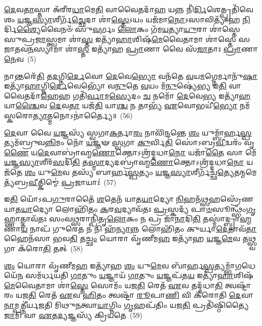 \-\ul{𑌦𑍇}\-𑌵\-\ul{𑌤𑌾}\-𑌸𑍍𑌤𑌾 𑌅᳴𑌰𑍀𑌰\-\ul{𑌧𑌾}\-𑌮𑍇\-\ul{𑌤𑌿} 𑌵𑌾𑌵𑍈𑌤𑌦𑌾᳴\-\ul{𑌹} 𑌯𑌨𑍍𑌨 𑌨𑌿᳴\-\ul{𑌰𑍍𑌦𑌿}\-𑌶𑍇𑌤𑍍𑌪𑍍𑌰𑌤𑌿᳴𑌵𑍇𑌶𑌂 \ul{𑌯}\-𑌜𑍍𑌞\-\ul{𑌸𑍍𑌯𑌾}\-𑌶𑍀𑌰𑍍𑌗᳴\-\ul{𑌚𑍍𑌛𑍇}\-𑌦𑌾 𑌶𑌾॑\-\ul{𑌸𑍍𑌤𑍇}\-\-𑌽𑌯𑌂 𑌯𑌜᳴𑌮𑌾\-\ul{𑌨𑍋}\-\-𑌽𑌸𑌾𑌵𑌿𑌤𑍍𑌯𑌾᳴𑌹 \ul{𑌨𑌿}\-𑌰𑍍𑌦𑌿\-\ul{𑌶𑍍𑌯𑍈}\-𑌵𑍈𑌨𑍞᳴ 𑌸𑍁\-\ul{𑌵}\-𑌰𑍍𑌗𑌂 \ul{𑌲𑍋}\-𑌕𑌂 𑌗᳴𑌮\-\ul{𑌯}\-𑌤𑍍𑌯𑌾\-\ul{𑌯𑍁}\-𑌰𑌾 𑌶𑌾॑𑌸𑍍𑌤𑍇 𑌸𑍁𑌪𑍍𑌰\-\ul{𑌜𑌾}\-𑌸𑍍𑌤𑍍𑌵𑌮𑌾 𑌶𑌾॑\-\ul{𑌸𑍍𑌤} 𑌇𑌤𑍍𑌯𑌾᳴\-\ul{𑌹𑌾}\-𑌶𑌿𑌷᳴\-\ul{𑌮𑍇}\-𑌵𑍈𑌤𑌾𑌮𑌾 𑌶𑌾॑𑌸𑍍𑌤𑍇 𑌸𑌜𑌾𑌤𑌵\-\ul{𑌨}\-𑌸𑍍𑌯𑌾𑌮𑌾 𑌶𑌾॑\-\ul{𑌸𑍍𑌤} 𑌇𑌤𑍍𑌯𑌾᳴𑌹 \ul{𑌪𑍍𑌰𑌾}\-𑌣𑌾 𑌵𑍈 𑌸᳴\-\ul{𑌜𑌾}\-𑌤𑌾𑌃 \ul{𑌪𑍍𑌰𑌾}\-𑌣𑌾\-\ul{𑌨𑍇}\-𑌵~(5)

𑌨𑌾𑌨𑍍𑌤𑌰𑍇᳴\-\ul{𑌤𑌿} 𑌤\-\ul{𑌦}\-𑌗𑍍𑌨𑌿\-\ul{𑌰𑍍𑌦𑍇}\-𑌵𑍋 \ul{𑌦𑍇}\-𑌵𑍇\-\ul{𑌭𑍍𑌯𑍋} 𑌵𑌨᳴𑌤𑍇 \ul{𑌵}\-𑌯\-\ul{𑌮}\-𑌗𑍍𑌨𑍇𑌰𑍍𑌮𑌾𑌨𑍁᳴\-\ul{𑌷𑌾} 𑌇𑌤𑍍𑌯𑌾᳴\-\ul{𑌹𑌾}\-𑌗𑍍𑌨𑌿\-\ul{𑌰𑍍𑌦𑍇}\-𑌵𑍇𑌭𑍍𑌯𑍋᳴ 𑌵\-\ul{𑌨𑍁}\-𑌤𑍇 \ul{𑌵}\-𑌯𑌂 𑌮᳴\-\ul{𑌨𑍁}\-𑌷𑍍𑌯𑍇॑\-\ul{𑌭𑍍𑌯} 𑌇\-\ul{𑌤𑌿} 𑌵𑌾𑌵𑍈𑌤𑌦𑌾᳴\-\ul{𑌹𑍇}\-𑌹 𑌗𑌤𑌿᳴\-\ul{𑌰𑍍𑌵𑌾}\-𑌮\-\ul{𑌸𑍍𑌯𑍇}\-𑌦𑌂 \ul{𑌚} 𑌨𑌮𑍋᳴ \ul{𑌦𑍇}\-𑌵𑍇\-\ul{𑌭𑍍𑌯} 𑌇𑌤𑍍𑌯𑌾᳴\-\ul{𑌹} 𑌯𑌾\-\ul{𑌶𑍍𑌚𑍈}\-𑌵 \ul{𑌦𑍇}\-𑌵\-\ul{𑌤𑌾} 𑌯𑌜᳴\-\ul{𑌤𑌿} 𑌯𑌾\-\ul{𑌶𑍍𑌚} 𑌨 𑌤𑌾𑌭𑍍𑌯᳴ \ul{𑌏}\-𑌵𑍋𑌭𑌯𑍀॑\-\ul{𑌭𑍍𑌯𑍋} 𑌨𑌮᳴𑌸𑍍𑌕𑌰𑍋\-\ul{𑌤𑍍𑌯𑌾}\-𑌤𑍍𑌮𑌨𑍋\-𑌽𑌨𑌾॑𑌰𑍍𑌤𑍍𑌯𑍈॥~(56)

{\anuvakamend[{\-\ul{𑌶𑍍𑌰𑌿}\-𑌤\-\ul{𑌸𑍍𑌤𑍇} 𑌪𑍍𑌰 \ul{𑌤𑍍𑌰𑌿}\-𑌷𑍍𑌟𑍁𑌭᳴\-\ul{𑌮𑍇}\-𑌤𑌦𑍍𑌦𑍍𑌯𑌾𑌵𑌾᳴𑌪𑍃\-\ul{𑌥𑌿}\-𑌵𑍀 𑌯𑌾 𑌅𑌯𑌾॑𑌕𑍍𑌷𑍍𑌮 \ul{𑌪𑍍𑌰𑌾}\-𑌣𑌾\-\ul{𑌨𑍇}\-𑌵 𑌷𑌟𑍍𑌚᳴𑌤𑍍𑌵𑌾𑌰𑌿𑍞𑌶𑌚𑍍𑌚}]}%

\-\ul{𑌦𑍇}\-𑌵𑌾 𑌵𑍈 \ul{𑌯}\-𑌜𑍍𑌞𑌸𑍍𑌯᳴ 𑌸𑍍𑌵𑌗𑌾\-\ul{𑌕}\-𑌰𑍍𑌤𑌾\-\ul{𑌰𑌂} 𑌨𑌾𑌵𑌿᳴\-\ul{𑌨𑍍𑌦}\-𑌨𑍍𑌤𑍇 \ul{𑌶𑌂} 𑌯𑍁𑌮𑍍𑌬𑌾᳴𑌰𑍍\mbox{}𑌹\-\ul{𑌸𑍍𑌪}\-𑌤𑍍𑌯𑌮᳴𑌬𑍍𑌰𑍁𑌵\-\ul{𑌨𑍍𑌨𑌿}\-𑌮𑌂 𑌨𑍋᳴ \ul{𑌯}\-𑌜𑍍𑌞𑍟 \ul{𑌸𑍍𑌵}\-𑌗𑌾 \ul{𑌕𑍁}\-𑌰𑍍𑌵𑌿\-\ul{𑌤𑌿} 𑌸𑍋॑\-𑌽𑌬𑍍𑌰\-\ul{𑌵𑍀}\-𑌦𑍍𑌵𑌰𑌂᳴ 𑌵𑍃\-\ul{𑌣𑍈} 𑌯\-\ul{𑌦𑍇}\-𑌵𑌾𑌬𑍍𑌰𑌾॑𑌹𑍍𑌮\-\ul{𑌣𑍋}\-𑌕𑍍𑌤𑍋\-𑌽𑌶𑍍𑌰᳴𑌦𑍍𑌦𑌧𑌾\-\ul{𑌨𑍋} 𑌯𑌜𑌾᳴\-\ul{𑌤𑍈} 𑌸𑌾 𑌮𑍇᳴ \ul{𑌯}\-𑌜𑍍𑌞\-\ul{𑌸𑍍𑌯𑌾}\-𑌶𑍀𑌰᳴\-\ul{𑌸}\-𑌦𑌿\-\ul{𑌤𑌿} 𑌤\-\ul{𑌸𑍍𑌮𑌾}\-𑌦𑍍𑌯𑌦𑌬𑍍𑌰𑌾॑𑌹𑍍𑌮\-\ul{𑌣𑍋}\-𑌕𑍍𑌤𑍋\-𑌽𑌶𑍍𑌰᳴𑌦𑍍𑌦𑌧𑌾\-\ul{𑌨𑍋} 𑌯𑌜᳴𑌤𑍇 \ul{𑌶𑌂} 𑌯𑍁\-\ul{𑌮𑍇}\-𑌵 𑌤𑌸𑍍𑌯᳴ 𑌬𑌾𑌰𑍍\mbox{}𑌹\-\ul{𑌸𑍍𑌪}\-𑌤𑍍𑌯𑌂 \ul{𑌯}\-𑌜𑍍𑌞\-\ul{𑌸𑍍𑌯𑌾}\-𑌶𑍀𑌰𑍍𑌗᳴𑌚𑍍𑌛\-\ul{𑌤𑍍𑌯𑍇}\-𑌤𑌨𑍍𑌮𑌮𑍇𑌤𑍍𑌯᳴𑌬𑍍𑌰\-\ul{𑌵𑍀}\-𑌤𑍍𑌕𑌿𑌮𑍍𑌮𑍇॑ \ul{𑌪𑍍𑌰}\-𑌜𑌾𑌯𑌾𑌃॑~(57)

𑌇\-\ul{𑌤𑌿} 𑌯𑍋᳴\-𑌽𑌪\-\ul{𑌗𑍁}\-𑌰𑌾𑌤𑍈᳴ \ul{𑌶}\-𑌤𑍇𑌨᳴ 𑌯𑌾𑌤\-\ul{𑌯𑌾}\-𑌦𑍍𑌯𑍋 \ul{𑌨𑌿}\-𑌹𑌨᳴\-\ul{𑌥𑍍𑌸}\-𑌹𑌸𑍍𑌰𑍇᳴𑌣 𑌯𑌾𑌤\-\ul{𑌯𑌾}\-𑌦𑍍𑌯𑍋 𑌲𑍋𑌹𑌿᳴𑌤𑌂 \ul{𑌕}\-𑌰\-\ul{𑌵}\-𑌦𑍍𑌯𑌾𑌵᳴𑌤𑌃 \ul{𑌪𑍍𑌰}\-𑌸𑍍𑌕𑌦𑍍𑌯᳴ 𑌪𑌾\-\ul{𑍞}\-𑌸𑍂𑌨𑍍𑌥𑍍𑌸𑌂᳴\-\ul{𑌗𑍃}\-𑌹𑍍𑌣𑌾𑌤𑍍𑌤𑌾𑌵᳴𑌤𑌃 𑌸𑌂𑌵\-\ul{𑌥𑍍𑌸}\-𑌰𑌾𑌨𑍍𑌪𑌿᳴𑌤𑍃\-\ul{𑌲𑍋}\-𑌕𑌂 𑌨 𑌪𑍍𑌰 𑌜𑌾᳴\-\ul{𑌨𑌾}\-𑌦𑌿\-\ul{𑌤𑌿} 𑌤𑌸𑍍𑌮𑌾॑𑌦𑍍𑌬𑍍𑌰𑌾\-\ul{𑌹𑍍𑌮}\-𑌣𑌾\-\ul{𑌯} 𑌨𑌾𑌪᳴ 𑌗𑍁𑌰𑍇\-\ul{𑌤} 𑌨 𑌨𑌿 𑌹᳴\-\ul{𑌨𑍍𑌯𑌾}\-𑌨𑍍𑌨 𑌲𑍋𑌹𑌿᳴𑌤𑌂 𑌕𑍁𑌰𑍍𑌯𑌾\-\ul{𑌦𑍇}\-𑌤𑌾𑌵᳴\-\ul{𑌤𑌾} 𑌹𑍈𑌨᳴𑌸𑌾 𑌭𑌵\-\ul{𑌤𑌿} 𑌤\-\ul{𑌚𑍍𑌛𑌂} 𑌯𑍋𑌰𑌾 𑌵𑍃᳴𑌣𑍀𑌮\-\ul{𑌹} 𑌇𑌤𑍍𑌯𑌾᳴𑌹 \ul{𑌯}\-𑌜𑍍𑌞\-\ul{𑌮𑍇}\-𑌵 𑌤\-\ul{𑌥𑍍𑌸𑍍𑌵}\-𑌗𑌾 𑌕᳴𑌰𑍋\-\ul{𑌤𑌿} 𑌤𑌤𑍍~(58)

\-\ul{𑌶𑌂} 𑌯𑍋𑌰𑌾 𑌵𑍃᳴𑌣𑍀𑌮\-\ul{𑌹} 𑌇𑌤𑍍𑌯𑌾᳴𑌹 \ul{𑌶𑌂} 𑌯𑍁\-\ul{𑌮𑍇}\-𑌵 𑌬𑌾᳴𑌰𑍍\mbox{}𑌹\-\ul{𑌸𑍍𑌪}\-𑌤𑍍𑌯𑌮𑍍𑌭𑌾᳴\-\ul{𑌗}\-𑌧𑍇𑌯𑍇᳴\-\ul{𑌨} 𑌸𑌮᳴𑌰𑍍𑌧𑌯𑌤𑌿 \ul{𑌗𑌾}\-𑌤𑍁𑌂 \ul{𑌯}\-𑌜𑍍𑌞𑌾𑌯᳴ \ul{𑌗𑌾}\-𑌤𑍁𑌂 \ul{𑌯}\-𑌜𑍍𑌞𑌪᳴𑌤\-\ul{𑌯} 𑌇𑌤𑍍𑌯𑌾᳴\-\ul{𑌹𑌾}\-𑌶𑌿𑌷᳴\-\ul{𑌮𑍇}\-𑌵𑍈𑌤𑌾𑌮𑌾 𑌶𑌾॑\-\ul{𑌸𑍍𑌤𑍇} 𑌸𑍋𑌮𑌂᳴ 𑌯𑌜\-\ul{𑌤𑌿} 𑌰𑍇𑌤᳴ \ul{𑌏}\-𑌵 𑌤𑌦𑍍𑌦᳴𑌧𑌾\-\ul{𑌤𑌿} 𑌤𑍍𑌵𑌷𑍍𑌟𑌾᳴𑌰𑌂 𑌯𑌜\-\ul{𑌤𑌿} 𑌰𑍇𑌤᳴ \ul{𑌏}\-𑌵 \ul{𑌹𑌿}\-𑌤𑌂 𑌤𑍍𑌵𑌷𑍍𑌟𑌾᳴ \ul{𑌰𑍂}\-𑌪𑌾\-\ul{𑌣𑌿} 𑌵𑌿 𑌕᳴𑌰𑍋𑌤𑌿 \ul{𑌦𑍇}\-𑌵𑌾\-\ul{𑌨𑌾}\-𑌮𑍍𑌪𑌤𑍍𑌨𑍀॑𑌰𑍍𑌯𑌜𑌤𑌿 𑌮𑌿𑌥𑍁\-\ul{𑌨}\-𑌤𑍍𑌵𑌾\-\ul{𑌯𑌾}\-𑌗𑍍𑌨𑌿𑌂 \ul{𑌗𑍃}\-𑌹𑌪᳴𑌤𑌿𑌂 𑌯𑌜\-\ul{𑌤𑌿} 𑌪𑍍𑌰𑌤𑌿᳴𑌷𑍍𑌠𑌿𑌤𑍍𑌯𑍈 \ul{𑌜𑌾}\-𑌮𑌿 𑌵𑌾 \ul{𑌏}\-𑌤\-\ul{𑌦𑍍𑌯}\-𑌜𑍍𑌞𑌸𑍍𑌯᳴ 𑌕𑍍𑌰𑌿𑌯𑌤𑍇~(59)

